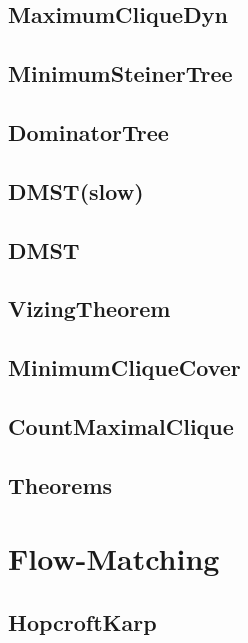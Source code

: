 \subsection{MaximumCliqueDyn}

\subsection{MinimumSteinerTree}

\subsection{DominatorTree}

\subsection{DMST(slow)}

\subsection{DMST}

\subsection{VizingTheorem}

\subsection{MinimumCliqueCover}

\subsection{CountMaximalClique}

\subsection{Theorems}

\section{Flow-Matching}
\subsection{HopcroftKarp}

